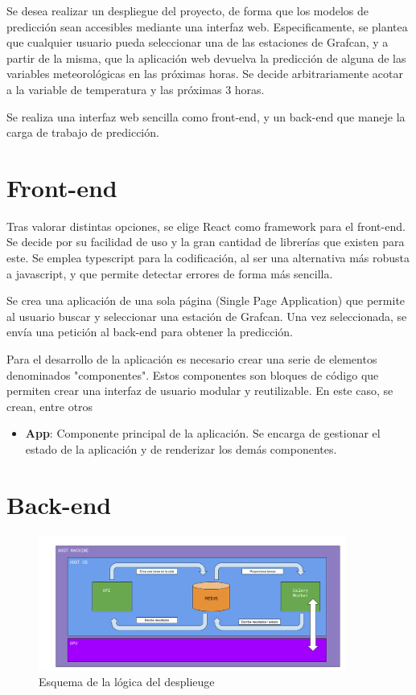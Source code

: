 
Se desea realizar un despliegue del proyecto, de forma que los modelos de predicción sean accesibles mediante una interfaz web. Especificamente, se plantea que cualquier usuario 
pueda seleccionar una de las estaciones de Grafcan, y a partir de la misma, que la aplicación web devuelva la predicción de alguna de las variables meteorológicas en las próximas horas. 
Se decide arbitrariamente acotar a la variable de temperatura y las próximas 3 horas.

Se realiza una interfaz web sencilla como front-end, y un back-end que maneje la carga de trabajo de predicción.

\section{Front-end}
Tras valorar distintas opciones, se elige React como framework para el front-end. Se decide por su facilidad de uso y la gran cantidad de librerías que existen para este.
Se emplea typescript para la codificación, al ser una alternativa más robusta a javascript, y que permite detectar errores de forma más sencilla.

Se crea una aplicación de una sola página (Single Page Application) que permite al usuario buscar y seleccionar una estación de Grafcan. Una vez seleccionada,
se envía una petición al back-end para obtener la predicción.

Para el desarrollo de la aplicación es necesario crear una serie de elementos denominados "componentes". Estos componentes son bloques de código que 
permiten crear una interfaz de usuario modular y reutilizable. En este caso, se crean, entre otros
\begin{itemize}
    \item \textbf{App}: Componente principal de la aplicación. Se encarga de gestionar el estado de la aplicación y de renderizar los demás componentes.
  
\end{itemize}


\section{Back-end}

\begin{figure}[H]
    \centering
    \includegraphics[width=0.9\textwidth]{images/esquema_despliegue.png}
    \caption{Esquema de la lógica del desplieuge}
    \label{deploy_scheme}
\end{figure}